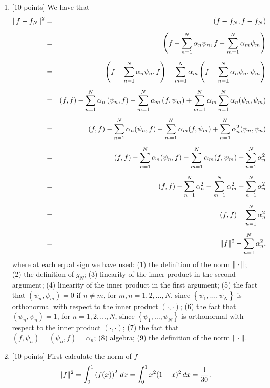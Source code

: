 \begin{solution}
\begin{enumerate}
\item {[10 points]} We have that
\begin{eqnarray*}
   \|f-f_N\|^2 &=& \left( f-f_N, f-f_N\right) \\[0.5em]
 &=& \left( f - \sum_{n=1}^N \alpha_n \psi_n,
                           f - \sum_{m=1}^N \alpha_m \psi_m\right) \\[0.5em]
 &=& \left( f - \sum_{n=1}^N \alpha_n \psi_n, f\right) 
              -\sum_{m=1}^N \alpha_m \left( f - \sum_{n=1}^N \alpha_n \psi_n,   \psi_m\right) \\[0.5em]
 &=& \left(f,f\right) - \sum_{n=1}^N \alpha_n\left( \psi_n, f\right) 
              - \sum_{m=1}^N \alpha_m\left( f,   \psi_m\right) 
           +  \sum_{m=1}^N \alpha_m \sum_{n=1}^N \alpha_n (\psi_n, \psi_m) \\[0.5em]
 &=& (f,f) - \sum_{n=1}^N \alpha_n (\psi_n, f) 
           - \sum_{m=1}^N \alpha_m (f,\psi_m)
           + \sum_{n=1}^N \alpha_n^2  (\psi_n, \psi_n)\\[0.5em]
 &=& (f,f) - \sum_{n=1}^N \alpha_n (\psi_n, f) 
           - \sum_{m=1}^N \alpha_m (f,\psi_m)
           + \sum_{n=1}^N \alpha_n^2\\[0.5em]
 &=& (f,f) - \sum_{n=1}^N \alpha_n^2  
           - \sum_{m=1}^N \alpha_m^2 
           + \sum_{n=1}^N \alpha_n^2 \\[0.5em]
 &=& (f,f) - \sum_{n=1}^N \alpha_n^2 \\[0.5em]
 &=& \|f\|^2 - \sum_{n=1}^N \alpha_n^2,
\end{eqnarray*}
where at each equal sign we have used:
(1) the definition of the norm $\|\cdot\|$;
(2) the definition of $g_N$;
(3) linearity of the inner product in the second argument;
(4) linearity of the inner product in the first argument;
(5) the fact that $(\psi_n,\psi_m) = 0$ if $n\ne m$, for $m,n=1,2,\ldots,N$, since $\left\{\psi_1,\ldots,\psi_N\right\}$ is orthonormal with respect to the inner product $(\cdot,\cdot)$;
(6) the fact that $(\psi_n,\psi_n) = 1$, for $n=1,2,\ldots,N$, since $\left\{\psi_1,\ldots,\psi_N\right\}$ is orthonormal with respect to the inner product $(\cdot,\cdot)$;
(7) the fact that $(f,\psi_n) = (\psi_n,f) = \alpha_n$;
(8) algebra;
(9) the definition of the norm $\|\cdot\|$.
\\
\item {[10 points]} First calculate the norm of $f$
 \[
\|f\|^2=\int_0^1\left(f(x)\right)^2\,dx=\int_0^1 x^2 (1-x)^2 \,dx=\frac{1}{30}.
\]
\end{enumerate}
\end{solution}
